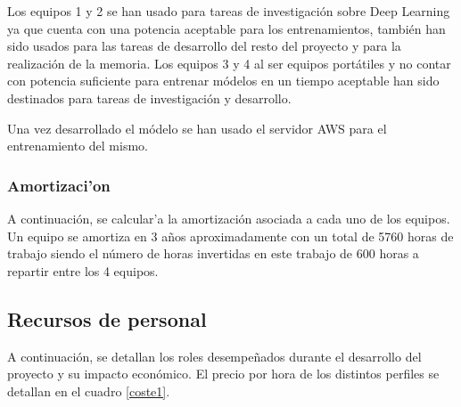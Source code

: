 
Los equipos 1 y 2 se han usado para tareas de investigación sobre Deep Learning ya que cuenta con una potencia aceptable para los entrenamientos, también han sido usados para las tareas de desarrollo del resto del proyecto y para la realización de la memoria. Los equipos 3 y 4 al ser equipos portátiles y no contar con potencia suficiente para entrenar módelos en un tiempo aceptable han sido destinados para tareas de investigación y desarrollo.

Una vez desarrollado el módelo se han usado el servidor AWS para el entrenamiento del mismo.

\subsubsection{Amortizaci'on}
A continuación, se calcular'a la amortización asociada a cada uno de los equipos.
Un equipo se amortiza en 3 años aproximadamente con un total de 5760 horas de trabajo siendo el número de horas invertidas en este trabajo de 600 horas a repartir entre los 4 equipos.


\pagebreak

\subsection{Recursos de personal}
A continuación, se detallan los roles desempeñados durante el desarrollo del proyecto y su impacto económico.
El precio por hora de los distintos perfiles se detallan en el cuadro \ref{coste1}.

